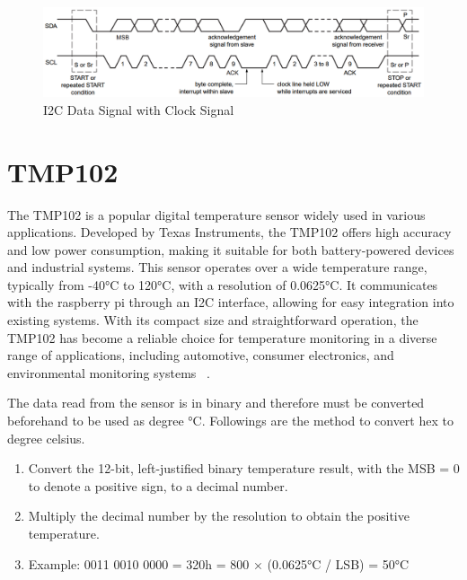 \begin{figure}
	\centering
	\includegraphics[width=.8\linewidth]{I2CInterface.png}
	\caption{I2C Data Signal with Clock Signal}\label{fig:fig2}
\end{figure}

\section{TMP102}
The TMP102 is a popular digital temperature sensor widely used in various applications. Developed by Texas Instruments, the TMP102 offers high accuracy and low power consumption, making it suitable for both battery-powered devices and industrial systems. This sensor operates over a wide temperature range, typically from -40°C to 120°C, with a resolution of 0.0625°C. It communicates with the raspberry pi through an I2C interface, allowing for easy integration into existing systems. With its compact size and straightforward operation, the TMP102 has become a reliable choice for temperature monitoring in a diverse range of applications, including automotive, consumer electronics, and environmental monitoring systems~\cite{TMP102_datasheet}
.

The data read from the sensor is in binary and therefore must be converted beforehand to be used as degree °C. Followings are the method to convert hex to degree celsius.

\begin{enumerate}
	\item Convert the 12-bit, left-justified binary temperature result, with the MSB = 0 to denote a positive sign, to a decimal number.
	\item Multiply the decimal number by the resolution to obtain the positive temperature.
	\item Example: 0011 0010 0000 = 320h = 800 × (0.0625°C / LSB) = 50°C
\end{enumerate}


